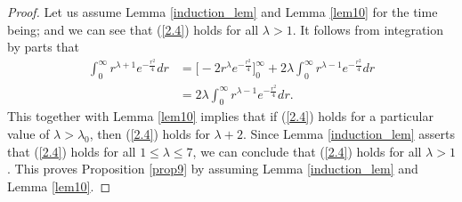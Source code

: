 \documentclass[10pt,a4paper]{amsart}
\begin{document}
\begin{proof}
Let us assume Lemma \ref{induction_lem} and Lemma \ref{lem10} for the time being;
and we can see that (\ref{2.4}) holds for all $\lambda>1$.
It follows from integration by parts that
\begin{equation*}
\begin{split}
\int_0^\infty r^{\lambda+1} e^{-\frac{r^2}{4}}dr
&=\Big[-2r^{\lambda}e^{-\frac{r^2}{4}}\Big]_0^\infty+2\lambda\int_0^\infty r^{\lambda-1} e^{-\frac{r^2}{4}}dr\\
&=2\lambda\int_0^\infty r^{\lambda-1} e^{-\frac{r^2}{4}}dr.
\end{split}
\end{equation*}
This together with Lemma \ref{lem10} implies that
if (\ref{2.4}) holds for a particular value of $\lambda>\lambda_0$, then
(\ref{2.4}) holds for $\lambda+2$.
Since Lemma \ref{induction_lem} asserts that (\ref{2.4}) holds for all $1\leq \lambda\leq 7$,
we can conclude that  (\ref{2.4}) holds for all $\lambda>1$.
This proves Proposition \ref{prop9} by assuming Lemma \ref{induction_lem} and Lemma \ref{lem10}.
\end{proof}
\end{document}
